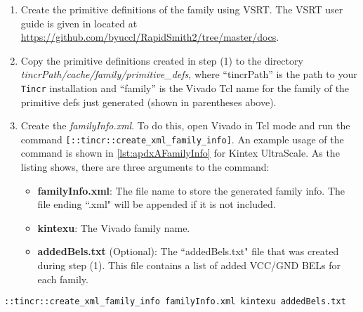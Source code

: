 \begin {enumerate}
  \item Create the primitive definitions of the family using VSRT. The VSRT user
  guide is given in located at {\color{blue}\url{
  https://github.com/byuccl/RapidSmith2/tree/master/docs}}.
  
  \item Copy the primitive definitions created in step (1) to the
   directory \textit{tincrPath/cache/family/primitive\_defs}, where
   ``tincrPath'' is the path to your \texttt{Tincr} installation and ``family''
   is the Vivado Tcl name for the family of the primitive defs just generated
   (shown in parentheses above).
   
   \item Create the \textit{familyInfo.xml}. To do this, open Vivado in Tcl mode
   and run the command \texttt{[::tin\-cr::create\-\_xml\_family\_info]}. An
   example usage of the command is shown in \autoref{lst:apdxAFamilyInfo} for
   Kintex UltraScale. As the listing shows, there are three arguments to the
   command:
   
	\begin{itemize}
	  \item \textbf{familyInfo.xml}: The file name to store the generated family
	  info. The file ending ``.xml" will be appended if it is not included.
	  \item \textbf{kintexu}: The Vivado family name.
	  \item \textbf{addedBels.txt} (Optional): The ``addedBels.txt" file that was
	  created during step (1). This file contains a list of added VCC/GND BELs for
	  each family.
	\end{itemize}    
\end{enumerate}

\begin{lstlisting}[numbers=none, caption=Family info example usage, label=lst:apdxAFamilyInfo] 
::tincr::create_xml_family_info familyInfo.xml kintexu addedBels.txt 
\end{lstlisting}


